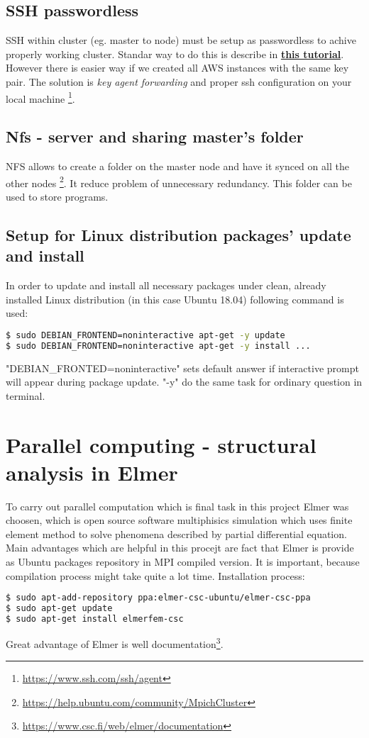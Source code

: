 \documentclass[11pt]{article}
\begin{document}

\subsection{SSH passwordless}
SSH within cluster (eg. master to node) must be setup as passwordless to achive properly working cluster. Standar way to do this is describe in \textbf{\hyperlink{https://help.ubuntu.com/community/MpichCluster}{this tutorial}}. However there is easier way if we created all AWS instances with the same key pair. The solution is \textit{key agent forwarding} and proper ssh configuration on your local machine \footnote{\url{https://www.ssh.com/ssh/agent}}. 

\subsection{Nfs - server and sharing master's folder}
NFS allows to create a folder on the master node and have it synced on all the other nodes \footnote{\url{https://help.ubuntu.com/community/MpichCluster}}. It reduce problem of unnecessary redundancy.  This folder can be used to store programs. 

\subsection{Setup for Linux distribution packages' update and install}
In order to update and install all necessary packages under clean, already installed Linux distribution (in this case Ubuntu 18.04) following command is used:
\begin{lstlisting}[language=bash]
$ sudo DEBIAN_FRONTEND=noninteractive apt-get -y update
$ sudo DEBIAN_FRONTEND=noninteractive apt-get -y install ...
\end{lstlisting}
"DEBIAN\_FRONTED=noninteractive" sets default answer if interactive prompt will appear during package update. "-y" do the same task for ordinary question in terminal.

\section{Parallel computing - structural analysis in Elmer}
To carry out parallel computation which is final task in this project Elmer was choosen, which is open source software multiphisics simulation which uses finite element method to solve phenomena described by partial differential equation. Main advantages which are helpful in this procejt are fact that Elmer is provide as Ubuntu packages repository in MPI compiled version. It is important, because compilation process might take quite a lot time. Installation process:
\begin{lstlisting}[language=bash]
$ sudo apt-add-repository ppa:elmer-csc-ubuntu/elmer-csc-ppa
$ sudo apt-get update
$ sudo apt-get install elmerfem-csc
\end{lstlisting}
Great advantage of Elmer is well documentation\footnote{\url{https://www.csc.fi/web/elmer/documentation}}.
\end{document}
